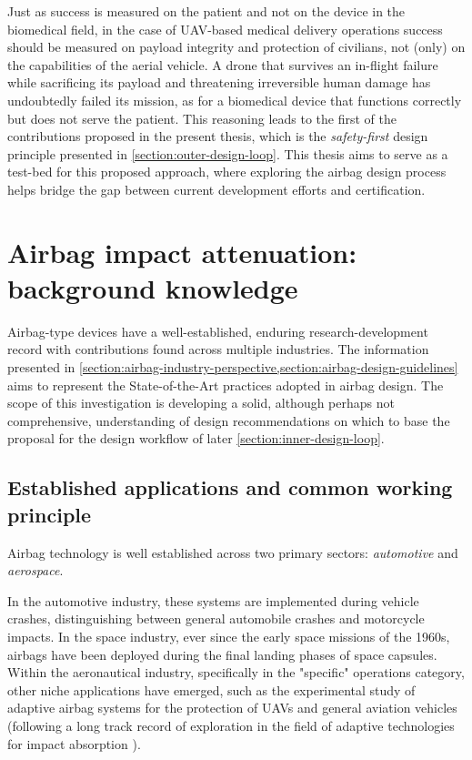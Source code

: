 Just as success is measured on the patient and not on the device in the biomedical field, in the case of UAV-based medical delivery operations success should be measured on payload integrity and protection of civilians, not (only) on the capabilities of the aerial vehicle. A drone that survives an in-flight failure while sacrificing its payload and threatening irreversible human damage has undoubtedly failed its mission, as for a biomedical device that functions correctly but does not serve the patient. This reasoning leads to the first of the contributions proposed in the present thesis, which is the \textit{safety-first} design principle presented in \cref{section:outer-design-loop}. This thesis aims to serve as a test-bed for this proposed approach, where exploring the airbag design process helps bridge the gap between current development efforts and certification.


\section{Airbag impact attenuation: background knowledge}\label{section:airbag-design-variables}
Airbag-type devices have a well-established, enduring research-development record with contributions found across multiple industries. The information presented in \cref{section:airbag-industry-perspective,section:airbag-design-guidelines} aims to represent the State-of-the-Art practices adopted in airbag design. The scope of this investigation is developing a solid, although perhaps not comprehensive, understanding of design recommendations on which to base the proposal for the design workflow of later \cref{section:inner-design-loop}.

\subsection{Established applications and common working principle}\label{section:airbag-industry-perspective}
Airbag technology is well established across two primary sectors: \textit{automotive} and \textit{aerospace}.

In the automotive industry, these systems are implemented during vehicle crashes, distinguishing between general automobile crashes and motorcycle impacts. In the space industry, ever since the early space missions of the 1960s, airbags have been deployed during the final landing phases of space capsules. Within the aeronautical industry, specifically in the "specific" operations category, other niche applications have emerged, such as the experimental study of adaptive airbag systems for the protection of UAVs and general aviation vehicles \cite{HolnickiSzulc2023} (following a long track record of exploration in the field of adaptive technologies for impact absorption \cite{HolnickiSzulc2015, HolnickiSzulc2009}). 

